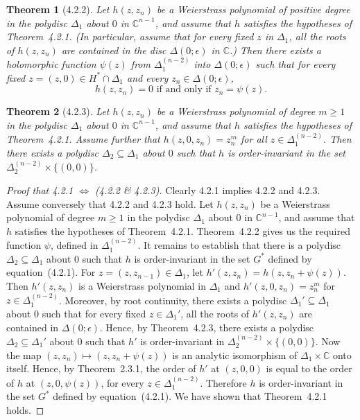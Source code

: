 \documentclass[11pt]{article}
\theoremstyle{plain}
\newtheorem*{theorem*}{Theorem}
\theoremstyle{definition}
\newcommand{\C}{\mathbb{C}}
\begin{document}
\begin{theorem*}[4.2.2]
Let $h(z, z_n)$ be a Weierstrass polynomial of positive degree in the
polydisc $\Delta_1$ about $0$ in $\C^{n-1}$, and assume that $h$
satisfies the hypotheses of Theorem~4.2.1. (In particular, assume
that for every fixed $z$ in $\Delta_1$, all the roots of $h(z, z_n)$
are contained in the disc $\Delta(0; \epsilon)$ in $\C$.) Then there
exists a holomorphic function $\psi(z)$ from $\Delta_1^{(n-2)}$ into
$\Delta(0; \epsilon)$ such that for every fixed
$z = (z, 0) \in H^* \cap \Delta_1$ and every $z_n \in \Delta(0; \epsilon)$,
\[
h(z, z_n) = 0 \text{ if and only if } z_n = \psi(z).
\]
\end{theorem*}

\begin{theorem*}[4.2.3]
Let $h(z, z_n)$ be a Weierstrass polynomial of degree $m \ge 1$ in the
polydisc $\Delta_1$ about $0$ in $\C^{n-1}$, and assume that $h$
satisfies the hypotheses of Theorem~4.2.1. Assume further that
$h(z, 0, z_n) = z_n^m$ for all $z \in \Delta_1^{(n-2)}$. Then there
exists a polydisc $\Delta_2 \subseteq \Delta_1$ about $0$ such that
$h$ is order-invariant in the set
$\Delta_2^{(n-2)} \times \{ (0, 0) \}$.
\end{theorem*}

\begin{proof}[Proof that 4.2.1 $\Leftrightarrow$ (4.2.2 \& 4.2.3)]
Clearly 4.2.1 implies 4.2.2 and 4.2.3. Assume conversely that 4.2.2
and 4.2.3 hold. Let $h(z, z_n)$ be a Weierstrass polynomial of degree
$m \ge 1$ in the polydisc $\Delta_1$ about $0$ in $\C^{n-1}$, and
assume that $h$ satisfies the hypotheses of Theorem~4.2.1.
Theorem~4.2.2 gives us the required function $\psi$, defined in
$\Delta_1^{(n-2)}$. It remains to establish that there is a polydisc
$\Delta_2 \subseteq \Delta_1$ about $0$ such that $h$ is
order-invariant in the set $G^*$ defined by equation~(4.2.1). For
$z = (z, z_{n-1}) \in \Delta_1$, let $h'(z, z_n) = h(z, z_n + \psi(z))$.
Then $h'(z, z_n)$ is a Weierstrass polynomial in $\Delta_1$ and
$h'(z, 0, z_n) = z_n^m$ for $z \in \Delta_1^{(n-2)}$. Moreover, by
root continuity, there exists a polydisc $\Delta_1' \subseteq \Delta_1$
about $0$ such that for every fixed $z \in \Delta_1'$, all the roots
of $h'(z, z_n)$ are contained in $\Delta(0; \epsilon)$. Hence, by
Theorem~4.2.3, there exists a polydisc $\Delta_2 \subseteq \Delta_1'$
about $0$ such that $h'$ is order-invariant in
$\Delta_2^{(n-2)} \times \{ (0, 0) \}$. Now the map
$(z, z_n) \mapsto (z, z_n + \psi(z))$ is an analytic isomorphism of
$\Delta_1 \times \C$ onto itself. Hence, by Theorem~2.3.1, the order
of $h'$ at $(z, 0, 0)$ is equal to the order of $h$ at
$(z, 0, \psi(z))$, for every $z \in \Delta_1^{(n-2)}$. Therefore $h$
is order-invariant in the set $G^*$ defined by equation~(4.2.1). We
have shown that Theorem~4.2.1 holds.
\end{proof}
\end{document}
